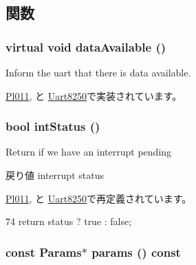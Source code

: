 \subsection{関数}
\hypertarget{classUart_a8e0026e4db90ce7efbddf2835f411b0b}{
\subsubsection[{dataAvailable}]{\setlength{\rightskip}{0pt plus 5cm}virtual void dataAvailable ()}}
\label{classUart_a8e0026e4db90ce7efbddf2835f411b0b}
Inform the uart that there is data available. 

\hyperlink{classPl011_a603e184f4f31471b76cff54303262aa8}{Pl011}, と \hyperlink{classUart8250_a603e184f4f31471b76cff54303262aa8}{Uart8250}で実装されています。\hypertarget{classUart_a73c7d9c634e4c31cda71a6dd2fa67381}{
\subsubsection[{intStatus}]{\setlength{\rightskip}{0pt plus 5cm}bool intStatus ()}}
\label{classUart_a73c7d9c634e4c31cda71a6dd2fa67381}
Return if we have an interrupt pending \begin{DoxyReturn}{戻り値}
interrupt status 
\end{DoxyReturn}


\hyperlink{classPl011_a57f9c26cb4108beccb35bb1938990932}{Pl011}, と \hyperlink{classUart8250_a57f9c26cb4108beccb35bb1938990932}{Uart8250}で再定義されています。


\begin{DoxyCode}
74 { return status ? true : false; }
\end{DoxyCode}
\hypertarget{classUart_acd3c3feb78ae7a8f88fe0f110a718dff}{
\subsubsection[{params}]{\setlength{\rightskip}{0pt plus 5cm}const {\bf Params}$\ast$ params () const}}
\label{classUart_acd3c3feb78ae7a8f88fe0f110a718dff}


